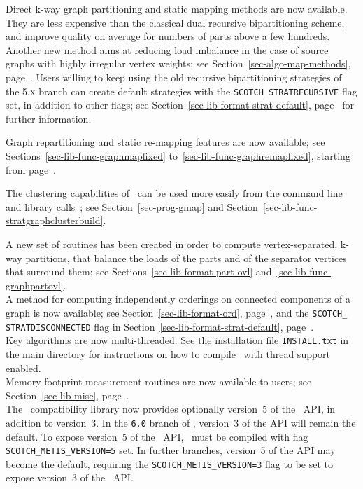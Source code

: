 Direct k-way graph partitioning and static mapping methods are now
available. They are less expensive than the classical dual recursive
bipartitioning scheme, and improve quality on average for numbers of
parts above a few hundreds. Another new method aims at reducing load
imbalance in the case of source graphs with highly irregular vertex
weights; see Section~\ref{sec-algo-map-methods},
page~\pageref{sec-algo-map-methods}. Users willing to keep using the
old recursive bipartitioning strategies of the \textsc{5.x} branch can
create default strategies with the \texttt{SCOTCH\_\lbt STRATRECURSIVE}
flag set, in addition to other flags; see
Section~\ref{sec-lib-format-strat-default},
page~\pageref{sec-lib-format-strat-default} for further information.

Graph repartitioning and static re-mapping features are now available;
see Sections~\ref{sec-lib-func-graphmapfixed}
to~\ref{sec-lib-func-graphremapfixed}, starting from
page~\pageref{sec-lib-func-graphmapfixed}.

The clustering capabilities of \scotch\ can be used more easily from
the command line and library calls~; see Section~\ref{sec-prog-gmap}
and Section~\ref{sec-lib-func-stratgraphclusterbuild}.

A new set of routines has been created in order to compute
vertex-separated, k-way partitions, that balance the loads of the
parts and of the separator vertices that surround them; see
Sections~\ref{sec-lib-format-part-ovl}
and~\ref{sec-lib-func-graphpartovl}.
\\

A method for computing independently orderings on connected components
of a graph is now available; see Section~\ref{sec-lib-format-ord},
page~\pageref{sec-lib-format-ord}, and the \texttt{SCOTCH\_\lbt
STRAT\lbt DISCON\lbt NECTED} flag in
Section~\ref{sec-lib-format-strat-default},
page~\pageref{sec-lib-format-strat-default}.
\\

Key algorithms are now multi-threaded. See the installation file
\texttt{INSTALL.txt} in the main directory for instructions on how to
compile \scotch\ with thread support enabled.
\\

Memory footprint measurement routines are now available to users;
see Section~\ref{sec-lib-misc}, page~\pageref{sec-lib-misc}.
\\

The \metis\ compatibility library now provides optionally version~5 of
the \metis\ API, in addition to version~3. In the \texttt{6.0} branch
of \scotch, version~3 of the API will remain the default. To expose
version~5 of the \metis\ API, \scotch\ must be compiled with flag
\texttt{SCOTCH\_\lbt METIS\_\lbt VERSION=5} set. In further branches,
version~5 of the API may become the default, requiring the
\texttt{SCOTCH\_\lbt METIS\_\lbt VERSION=3} flag to be set to expose
version~3 of the \metis\ API.

